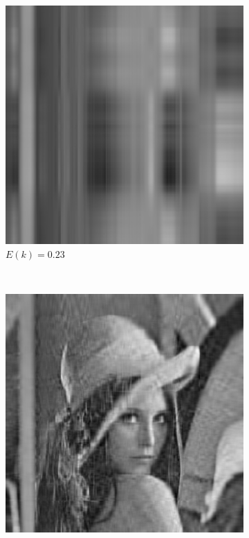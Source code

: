 \documentclass[a4paper,12pt]{article}
\begin{document}
\begin{figure}[!htb]
\begin{subfigure}[b]{0.2\linewidth}
    \includegraphics[width=\linewidth]{img/lena_20.jpg}
    \caption{$E(k) = 0.23$}
\end{subfigure}\\
\begin{subfigure}[b]{0.2\linewidth}
    \includegraphics[width=\linewidth]{img/lena_90.jpg}

\end{subfigure}
\end{figure}
\end{document}
